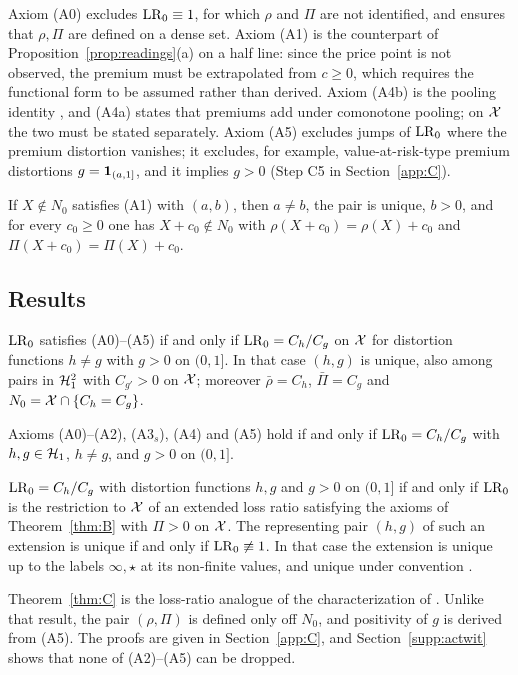 Axiom (A0) excludes $\mathrm{LR}_0\equiv1$, for which $\rho$ and $\Pi$ are not identified, and ensures that $\rho,\Pi$ are
defined on a dense set. Axiom (A1) is the counterpart of Proposition~\ref{prop:readings}(a) on a half line: since
the price point is not observed, the premium must be extrapolated from $c\ge0$, which requires the functional
form to be assumed rather than derived. Axiom (A4b) is the pooling identity \axCM, and (A4a) states that premiums
add under comonotone pooling; on $\mathcal X$ the two must be stated separately. Axiom (A5) excludes jumps of $\mathrm{LR}_0$
where the premium distortion vanishes; it excludes, for example, value-at-risk-type premium distortions
$g=\mathbf 1_{(a,1]}$, and it implies $g>0$ (Step C5 in Section~\ref{app:C}).

\begin{lemma}\label{lem:halfline}
If $X\notin N_0$ satisfies (A1) with $(a,b)$, then $a\ne b$, the pair is unique, $b>0$, and for every
$c_0\ge0$ one has $X+c_0\notin N_0$ with $\rho(X+c_0)=\rho(X)+c_0$ and $\Pi(X+c_0)=\Pi(X)+c_0$.
\end{lemma}

\subsection{Results}

\begin{theorem}\label{thm:C}
$\mathrm{LR}_0$ satisfies (A0)--(A5) if and only if $\mathrm{LR}_0=C_h/C_g$ on $\mathcal X$ for distortion functions $h\ne g$
with $g>0$ on $(0,1]$. In that case $(h,g)$ is unique, also among pairs in $\mathcal H_1^2$ with
$C_{g'}>0$ on $\mathcal X$; moreover $\bar\rho=C_h$, $\bar\Pi=C_g$ and $N_0=\mathcal X\cap\{C_h=C_g\}$.
\end{theorem}

\begin{theorem}\label{thm:Cp}
Axioms (A0)--(A2), (A3$_s$), (A4) and (A5) hold if and only if $\mathrm{LR}_0=C_h/C_g$ with $h,g\in\mathcal H_1$, $h\ne g$,
and $g>0$ on $(0,1]$.
\end{theorem}

\begin{proposition}\label{prop:bridge}
$\mathrm{LR}_0=C_h/C_g$ with distortion functions $h,g$ and $g>0$ on $(0,1]$ if and only if $\mathrm{LR}_0$ is the restriction to
$\mathcal X$ of an extended loss ratio satisfying the axioms of Theorem~\ref{thm:B} with $\Pi>0$ on $\mathcal X$. The representing
pair $(h,g)$ of such an extension is unique if and only if $\mathrm{LR}_0\not\equiv1$. In that case the extension is unique up
to the labels $\infty,\star$ at its non-finite values, and unique under convention .
\end{proposition}

Theorem~\ref{thm:C} is the loss-ratio analogue of the characterization of \citet{wyp1997}. Unlike that result,
the pair $(\rho,\Pi)$ is defined only off $N_0$, and positivity of $g$ is derived from (A5). The proofs are given in
Section~\ref{app:C}, and Section~\ref{supp:actwit} shows that none of (A2)--(A5) can be dropped.
